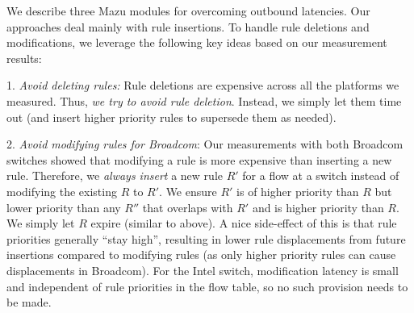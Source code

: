 

We describe three Mazu modules for overcoming outbound
latencies. 
Our approaches deal mainly with rule insertions. To
handle rule deletions and modifications, we leverage the
following key ideas based on our measurement results: 

1. {\em Avoid
  deleting rules:} Rule deletions are expensive across
all the platforms we measured. Thus, {\em we try to avoid rule deletion}.
Instead, we simply let them time out (and insert higher priority rules
to supersede them as needed). 

2. {\em
  Avoid modifying rules for Broadcom}: Our measurements with both
Broadcom switches showed that modifying a rule is more expensive than
inserting a new rule.
Therefore, we {\em always insert} a new rule $R'$ for a flow at a switch instead
of modifying the existing $R$ to $R'$. We ensure $R'$ is of higher priority than $R$
but lower priority than any $R''$ that overlaps with $R'$ and is
higher priority than $R$. We simply let $R$ expire (similar to
above). A nice side-effect of this is that rule priorities
generally ``stay high'', resulting in lower rule displacements from
future insertions compared to modifying rules (as only higher priority
rules can cause displacements in Broadcom). For the Intel switch,
modification latency is small and independent of rule priorities in the flow table, so
no such provision needs to be made.


